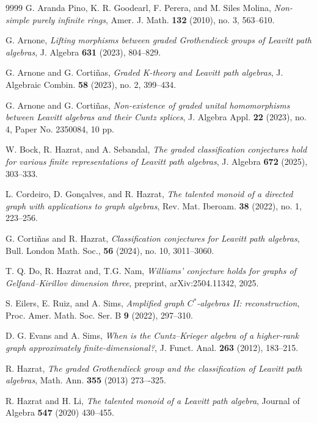 \documentclass[a4paper,reqno,12pt]{amsart}
\numberwithin{equation}{section}
\theoremstyle{definition}
\theoremstyle{remark}
\begin{document}
\begin{thebibliography}{9999}
G. Aranda Pino, K. R. Goodearl, F. Perera, and M. Siles Molina, \emph{Non-simple purely infinite rings}, Amer. J. Math. \textbf{132} (2010), no. 3, 563--610.

G. Arnone, \emph{Lifting morphisms between graded Grothendieck groups of Leavitt path algebras}, J. Algebra {\bf 631} (2023), 804--829.

G. Arnone and G. Corti\~nas, \emph{Graded K-theory and Leavitt path algebras}, J. Algebraic Combin. {\bf 58} (2023), no. 2, 399--434.

G. Arnone and G. Cortiñas, \emph{Non-existence of graded unital homomorphisms between Leavitt algebras and their Cuntz splices}, J. Algebra Appl. {\bf 22} (2023), no. 4, Paper No. 2350084, 10 pp.

W. Bock, R. Hazrat, and A. Sebandal, \emph{The graded classification conjectures hold for various finite representations of Leavitt path algebras}, J. Algebra \textbf{672} (2025), 303--333.

L. Cordeiro, D. Gon\c{c}alves, and R. Hazrat, \emph{The talented monoid of a directed graph with applications to graph algebras}, Rev. Mat. Iberoam. {\bf 38} (2022), no. 1, 223--256.

G. Corti\~nas and R. Hazrat, \emph{Classification conjectures for Leavitt path algebras},  Bull. London Math. Soc., {\bf 56} (2024), no. 10, 3011--3060.

T. Q. Do, R. Hazrat and, T.G. Nam, {\it Williams' conjecture holds for graphs of Gelfand--Kirillov dimension three}, preprint, arXiv:2504.11342, 2025.

S. Eilers, E. Ruiz, and A. Sims, {\it Amplified graph $C^*$-algebras II: reconstruction},
Proc. Amer. Math. Soc. Ser. B {\bf 9} (2022), 297--310.

D. G. Evans and A. Sims, \emph{When is the Cuntz--Krieger algebra of a higher-rank graph approximately finite-dimensional?}, J. Funct. Anal. \textbf{263} (2012), 183--215.

R. Hazrat, {\it The graded Grothendieck group and the classification of Leavitt path algebras}, Math. Ann. {\bf 355} (2013) 273–-325.

R. Hazrat and H. Li, \emph{The talented monoid of a Leavitt path algebra}, Journal of Algebra {\bf 547} (2020) 430--455.


\end{thebibliography}
\end{document}
